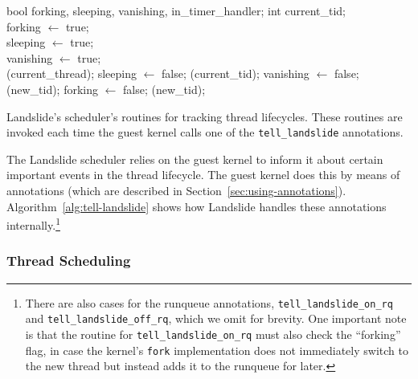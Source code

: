 \begin{algorithm}[t]
	\footnotesize
	\begin{algorithmic}
		\State bool forking, sleeping, vanishing, in\_timer\_handler;
		\State int current\_tid;
		\\
			\State forking $\gets$ true;
		\EndFunction
		\\
			\State sleeping $\gets$ true;
		\EndFunction
		\\
			\State vanishing $\gets$ true;
		\EndFunction
		\\
					(current\_thread);
					\State sleeping $\gets$ false;
					(current\_tid);
					\State vanishing $\gets$ false;
					(new\_tid);
					\State forking $\gets$ false;
				\EndIf
			\EndIf
			(new\_tid);
		\EndFunction
	\end{algorithmic}
	\caption{Landslide's scheduler's routines for tracking thread lifecycles. These routines are invoked each time the guest kernel calls one of the \texttt{tell\_landslide} annotations.}
	\label{alg:tell-landslide}
\end{algorithm}

The Landslide scheduler relies on the guest kernel to inform it about certain important events in the thread lifecycle. The guest kernel does this by means of annotations (which are described in Section~\ref{sec:using-annotations}). Algorithm~\ref{alg:tell-landslide} shows how Landslide handles these annotations internally.\footnote{
There are also cases for the runqueue annotations, \texttt{tell\_landslide\_on\_rq} and \texttt{tell\_landslide\_off\_rq}, which we omit for brevity. One important note is that the routine for \texttt{tell\_landslide\_on\_rq} must also check the ``forking'' flag, in case the kernel's \texttt{fork} implementation does not immediately switch to the new thread but instead adds it to the runqueue for later.}

\subsubsection{Thread Scheduling}
\label{sec:components-inflight}

